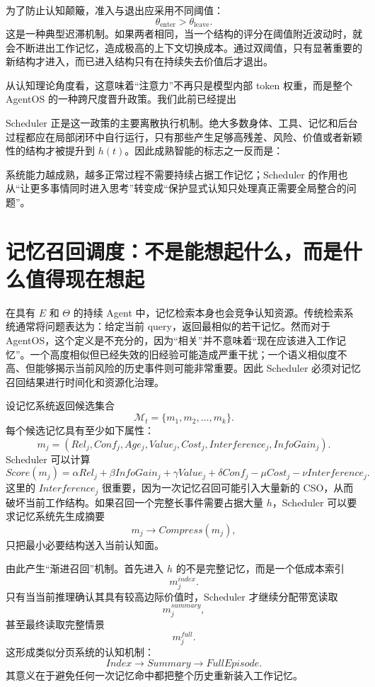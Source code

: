 为了防止认知颠簸，准入与退出应采用不同阈值：
\[
\theta_{\mathrm{enter}}
>
\theta_{\mathrm{leave}}.
\]
这是一种典型迟滞机制。如果两者相同，当一个结构的评分在阈值附近波动时，就会不断进出工作记忆，造成极高的上下文切换成本。通过双阈值，只有显著重要的新结构才进入，而已进入结构只有在持续失去价值后才退出。

从认知理论角度看，这意味着“注意力”不再只是模型内部 token 权重，而是整个 AgentOS 的一种跨尺度晋升政策。我们此前已经提出
\begin{statementbox}
\centering
{}
\end{statementbox}
Scheduler 正是这一政策的主要离散执行机制。绝大多数身体、工具、记忆和后台过程都应在局部闭环中自行运行，只有那些产生足够高残差、风险、价值或者新颖性的结构才被提升到 $h(t)$。因此成熟智能的标志之一反而是：
\begin{statementbox}
\centering
{}
\end{statementbox}
系统能力越成熟，越多正常过程不需要持续占据工作记忆；Scheduler 的作用也从“让更多事情同时进入思考”转变成“保护显式认知只处理真正需要全局整合的问题”。

\section{记忆召回调度：不是能想起什么，而是什么值得现在想起}

在具有 $E$ 和 $\Theta$ 的持续 Agent 中，记忆检索本身也会竞争认知资源。传统检索系统通常将问题表达为：给定当前 query，返回最相似的若干记忆。然而对于 AgentOS，这个定义是不充分的，因为“相关”并不意味着“现在应该进入工作记忆”。一个高度相似但已经失效的旧经验可能造成严重干扰；一个语义相似度不高、但能够揭示当前风险的历史事件则可能非常重要。因此 Scheduler 必须对记忆召回结果进行时间化和资源化治理。

设记忆系统返回候选集合
\[
\mathcal M_t=
\{m_1,m_2,\ldots,m_k\}.
\]
每个候选记忆具有至少如下属性：
\[
m_j=
(
Rel_j,
Conf_j,
Age_j,
Value_j,
Cost_j,
Interference_j,
InfoGain_j
).
\]
Scheduler 可以计算
\[
Score(m_j)
=
\alpha Rel_j
+
\beta InfoGain_j
+
\gamma Value_j
+
\delta Conf_j
-
\mu Cost_j
-
\nu Interference_j.
\]
这里的 $Interference_j$ 很重要，因为一次记忆召回可能引入大量新的 CSO，从而破坏当前工作结构。如果召回一个完整长事件需要占据大量 $h$，Scheduler 可以要求记忆系统先生成摘要
\[
m_j\rightarrow Compress(m_j),
\]
只把最小必要结构送入当前认知面。

由此产生“渐进召回”机制。首先进入 $h$ 的不是完整记忆，而是一个低成本索引
\[
m_j^{index}.
\]
只有当当前推理确认其具有较高边际价值时，Scheduler 才继续分配带宽读取
\[
m_j^{summary},
\]
甚至最终读取完整情景
\[
m_j^{full}.
\]
这形成类似分页系统的认知机制：
\[
Index
\rightarrow
Summary
\rightarrow
FullEpisode.
\]
其意义在于避免任何一次记忆命中都把整个历史重新装入工作记忆。

